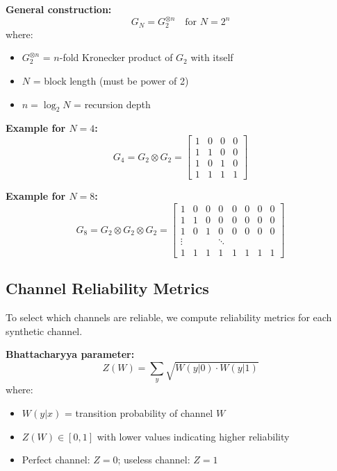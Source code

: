 \textbf{General construction:}
\begin{equation}
G_N = G_2^{\otimes n} \quad \text{for } N = 2^n
\end{equation}
where:
\begin{itemize}
\item $G_2^{\otimes n}$ = $n$-fold Kronecker product of $G_2$ with itself
\item $N$ = block length (must be power of 2)
\item $n = \log_2 N$ = recursion depth
\end{itemize}

\textbf{Example for $N=4$:}
\begin{equation}
G_4 = G_2 \otimes G_2 = \begin{bmatrix}
1 & 0 & 0 & 0 \\
1 & 1 & 0 & 0 \\
1 & 0 & 1 & 0 \\
1 & 1 & 1 & 1
\end{bmatrix}
\end{equation}

\textbf{Example for $N=8$:}
\begin{equation}
G_8 = G_2 \otimes G_2 \otimes G_2 = \begin{bmatrix}
1 & 0 & 0 & 0 & 0 & 0 & 0 & 0 \\
1 & 1 & 0 & 0 & 0 & 0 & 0 & 0 \\
1 & 0 & 1 & 0 & 0 & 0 & 0 & 0 \\
\vdots & & & \ddots & & & & \\
1 & 1 & 1 & 1 & 1 & 1 & 1 & 1
\end{bmatrix}
\end{equation}

\subsection{Channel Reliability Metrics}

To select which channels are reliable, we compute reliability metrics for each synthetic channel.

\textbf{Bhattacharyya parameter:}
\begin{equation}
Z(W) = \sum_{y} \sqrt{W(y|0) \cdot W(y|1)}
\end{equation}
where:
\begin{itemize}
\item $W(y|x)$ = transition probability of channel $W$
\item $Z(W) \in [0, 1]$ with lower values indicating higher reliability
\item Perfect channel: $Z = 0$; useless channel: $Z = 1$
\end{itemize}

